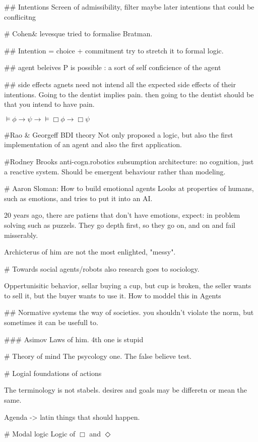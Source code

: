 \documentclass{article}
\begin{document}
## Intentions
Screen of admissibility, filter maybe later intentions that could be
conflicitng


# Cohen& levesque
tried to formalise Bratman.

## Intention = choice + commitment
try to stretch it to formal logic.

##
agent beleives P is possible : a sort of self conficience of the agent

## side effects
agnets need not intend all the expected side effects of their intentions.
Going to the dentist implies pain.
then going to the dentist should be that you intend to have pain.

$\vDash \phi \to \psi \to \vDash \Box \phi \to \Box \psi$

#Rao & Georgeff BDI theory
Not only proposed a logic, but also the first implementation of an agent and
also the first application.

#Rodney Brooks anti-cogn.robotics
subsumption architecture: no cognition, just a reactive system.
Should be emergent behaviour rather than modeling.

# Aaron Sloman: How to build emotional agents
Looks at properties of humans, such as emotions, and tries to put it into an
AI.

20 years ago, there are patiens that don't have emotions, expect: in problem
solving such as puzzels. They go depth first, so they go on, and on and fail
misserably.

Archicterus of him are not the most enlighted, "messy".

# Towards social agents/robots
also research goes to sociology.

Oppertunisitic behavior, sellar buying a cup, but cup is broken,
the seller wants to sell it, but the buyer wants to use it. How
to moddel this in Agents

## Normative systems
the way of societies. you shouldn't violate the norm, but sometimes it can
be usefull to.

### Asimov
Laws of him. 4th one is stupid

# Theory of mind
The psycology one.
The false believe test.


# Logial foundations of actions

The terminology is not stabels.
desires and goals may be differetn or mean the same.

Agenda -> latin things that should happen.

# Modal logic
Logic of $\Box$ and $\Diamond$
\end{document}
